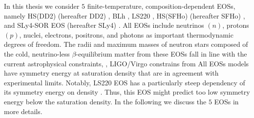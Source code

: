 In this thesis we consider $5$ finite-temperature, composition-dependent \acp{EOS}, namely 
HS(DD2) (hereafter DD2) \citep{Typel:2009sy,Hempel:2009mc}, 
BLh \citep{Bombaci:2018ksa}, 
LS220 \citep{Lattimer:1991nc}, 
HS(SFHo) (hereafter SFHo) \citep{Steiner:2012rk}, and 
SLy4-SOR EOS (hereafter SLy4) \citep{daSilvaSchneider:2017jpg}.
%
All \acp{EOS} include neutrinos $(n)$, protons $(p)$, nuclei, electrons, positrons, and photons
as important thermodynamic degrees of freedom.
%
The radii and maximum masses of neutron stars composed of the cold, neutrino-less $\beta$-equilibrium matter
from these \acp{EOS} fall in line with the current astrophysical constraints, 
\eg, LIGO/Virgo constrains from \GW{} 
\citep{TheLIGOScientific:2017qsa,Abbott:2018wiz,De:2018uhw,Abbott:2018exr}
%
All \acp{EOS} models have symmetry energy at saturation density that are in agreement with experimental limits.
Notably, LS220 \ac{EOS} has a particularly steep dependency of its symmetry energy on density \citep[\eg][]{Lattimer:2012xj,Danielewicz:2013upa}. 
Thus, this \ac{EOS} might predict too low symmetry energy below the saturation density. In the following we discuss the $5$ \acp{EOS} in more details.

